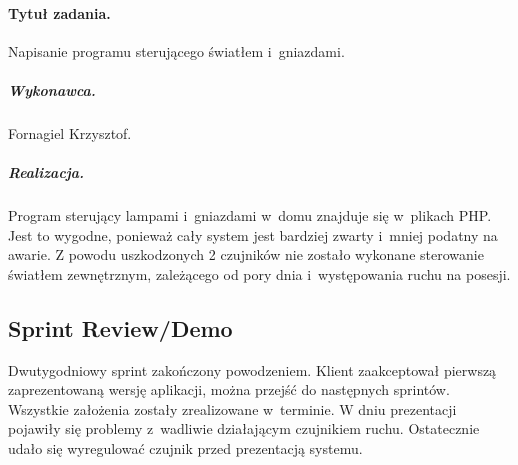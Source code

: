 	\paragraph{Tytuł zadania.} Napisanie programu sterującego światłem i~gniazdami.
	\subparagraph{Wykonawca.} Fornagiel Krzysztof.
	\subparagraph{Realizacja.} Program sterujący lampami i~gniazdami w~domu znajduje się w~plikach PHP. Jest to wygodne, ponieważ cały system jest bardziej zwarty i~mniej podatny na awarie. Z powodu uszkodzonych 2 czujników nie zostało wykonane sterowanie światłem zewnętrznym, zależącego od pory dnia i~występowania ruchu na posesji.

	
	\subsection{Sprint Review/Demo}
	Dwutygodniowy sprint zakończony powodzeniem. Klient zaakceptował pierwszą zaprezentowaną wersję aplikacji, można przejść do następnych sprintów. Wszystkie założenia zostały zrealizowane w~terminie. W dniu prezentacji pojawiły się problemy z~wadliwie działającym czujnikiem ruchu. Ostatecznie udało się wyregulować czujnik przed prezentacją systemu.
	